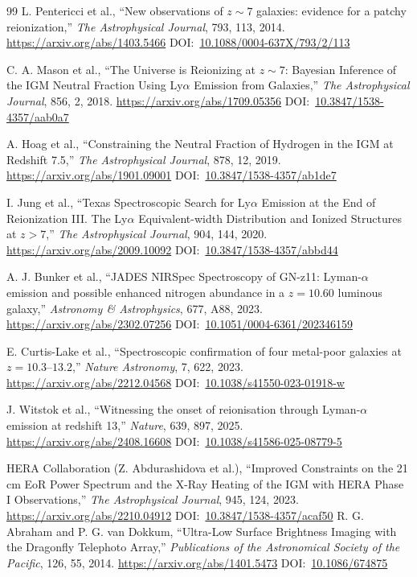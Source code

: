 \documentclass[10pt,onecolumn]{article}
\newcommand{\doi}[1]{DOI:~\href{https://doi.org/#1}{#1}}
\begin{document}
\begin{thebibliography}{99}
L. Pentericci et al.,
``New observations of $z\sim7$ galaxies: evidence for a patchy reionization,''
\emph{The Astrophysical Journal}, 793, 113, 2014.
\url{https://arxiv.org/abs/1403.5466}
\doi{10.1088/0004-637X/793/2/113}

C. A. Mason et al.,
``The Universe is Reionizing at $z\sim7$: Bayesian Inference of the IGM Neutral Fraction Using Ly$\alpha$ Emission from Galaxies,''
\emph{The Astrophysical Journal}, 856, 2, 2018.
\url{https://arxiv.org/abs/1709.05356}
\doi{10.3847/1538-4357/aab0a7}

A. Hoag et al.,
``Constraining the Neutral Fraction of Hydrogen in the IGM at Redshift 7.5,''
\emph{The Astrophysical Journal}, 878, 12, 2019.
\url{https://arxiv.org/abs/1901.09001}
\doi{10.3847/1538-4357/ab1de7}

I. Jung et al.,
``Texas Spectroscopic Search for Ly$\alpha$ Emission at the End of Reionization III. The Ly$\alpha$ Equivalent-width Distribution and Ionized Structures at $z>7$,''
\emph{The Astrophysical Journal}, 904, 144, 2020.
\url{https://arxiv.org/abs/2009.10092}
\doi{10.3847/1538-4357/abbd44}

A. J. Bunker et al.,
``JADES NIRSpec Spectroscopy of GN-z11: Lyman-$\alpha$ emission and possible enhanced nitrogen abundance in a $z=10.60$ luminous galaxy,''
\emph{Astronomy \& Astrophysics}, 677, A88, 2023.
\url{https://arxiv.org/abs/2302.07256}
\doi{10.1051/0004-6361/202346159}

E. Curtis-Lake et al.,
``Spectroscopic confirmation of four metal-poor galaxies at $z=10.3$--$13.2$,''
\emph{Nature Astronomy}, 7, 622, 2023.
\url{https://arxiv.org/abs/2212.04568}
\doi{10.1038/s41550-023-01918-w}

J. Witstok et al.,
``Witnessing the onset of reionisation through Lyman-$\alpha$ emission at redshift 13,''
\emph{Nature}, 639, 897, 2025.
\url{https://arxiv.org/abs/2408.16608}
\doi{10.1038/s41586-025-08779-5}

HERA Collaboration (Z. Abdurashidova et al.),
``Improved Constraints on the 21 cm EoR Power Spectrum and the X-Ray Heating of the IGM with HERA Phase I Observations,''
\emph{The Astrophysical Journal}, 945, 124, 2023.
\url{https://arxiv.org/abs/2210.04912}
\doi{10.3847/1538-4357/acaf50}
R. G. Abraham and P. G. van Dokkum,
``Ultra-Low Surface Brightness Imaging with the Dragonfly Telephoto Array,''
\emph{Publications of the Astronomical Society of the Pacific}, 126, 55, 2014.
\url{https://arxiv.org/abs/1401.5473}
\doi{10.1086/674875}


\end{thebibliography}
\end{document}
